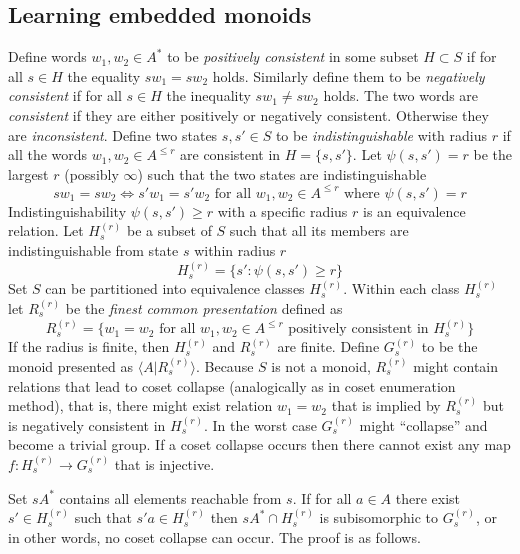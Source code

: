 \documentclass[12pt]{article}
\begin{document}
\subsection{Learning embedded monoids}
Define words $w_1,w_2\in A^*$ to be \textit{positively consistent} in some subset $H\subset S$ if for all $s\in H$ the equality $sw_1=sw_2$ holds. Similarly define them to be \textit{negatively consistent} if for all $s\in H$ the inequality $sw_1\ne sw_2$ holds. The two words are \textit{consistent} if they are either positively or negatively consistent. Otherwise they are \textit{inconsistent}.
Define two states $s,s'\in S$ to be \textit{indistinguishable} with radius $r$ if all the words $w_1,w_2\in A^{\le r}$ are consistent in $H=\{s,s'\}$. Let 
$\psi(s,s')=r$ be the largest $r$ (possibly $\infty$) such that the two states are indistinguishable
\[
sw_1=sw_2 \iff s'w_1=s'w_2\text{ for all }w_1,w_2\in A^{\le r}\text{ where }\psi(s,s')=r
\]
Indistinguishability $\psi(s,s')\ge r$ with a specific radius $r$ is an equivalence relation. Let $H_{s}^{(r)}$ be a subset of $S$ such that all its members are indistinguishable from state $s$ within radius $r$
\[
H_{s}^{(r)} = \{s' : \psi(s,s')\ge r \}
\]
Set $S$ can be partitioned into equivalence classes $H_{s}^{(r)}$.
Within each class  $H_{s}^{(r)}$ let  $R_{s}^{(r)}$ be the \textit{finest common presentation} defined as
\[
R_{s}^{(r)} = \{ w_1=w_2 \text{ for all }w_1,w_2\in A^{\le r}\text{ positively consistent in }H_{s}^{(r)}  \}
\]
If the radius is finite, then $H_{s}^{(r)}$ and $R_{s}^{(r)}$ are finite. Define $G_{s}^{(r)}$ to be the monoid presented as $\langle A | R_{s}^{(r)} \rangle$.
Because $S$ is not a monoid, $R_{s}^{(r)}$ might contain relations that lead to coset collapse (analogically as in coset enumeration method), that is, there might exist relation $w_1=w_2$ that is implied by $R_{s}^{(r)}$ but is negatively consistent in $H_{s}^{(r)}$. In the worst case $G_{s}^{(r)}$ might ``collapse'' and become a trivial group.  If a coset collapse occurs then there cannot exist any map $f:H_{s}^{(r)} \rightarrow G_{s}^{(r)}$ that is injective.  

Set $sA^*$ contains all elements reachable from $s$.
If for all $a\in A$  there exist $s'\in H_{s}^{(r)}$ such that $s'a\in H_{s}^{(r)}$ then $sA^*\cap H_{s}^{(r)}$ is subisomorphic to $G_{s}^{(r)}$, or in other words, no coset collapse can occur. The proof is as follows. 
\end{document}
